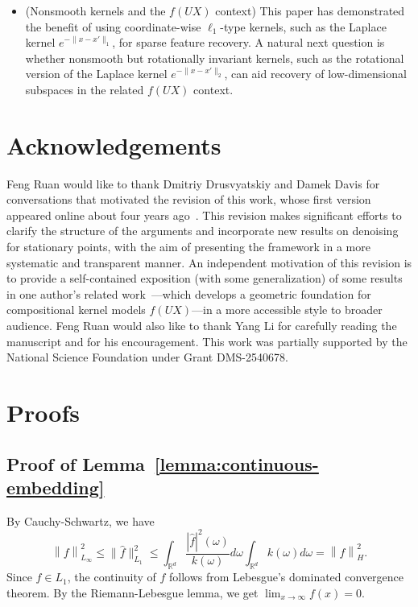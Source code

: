 \documentclass[sn-mathphys-num]{sn-jnl}%
\numberwithin{equation}{section}
\newcommand{\R}{\mathbb{R}}
\newcommand{\norm}[1]{\left\|{#1}\right\|} %
\theoremstyle{thmstyleone}%
\theoremstyle{thmstyletwo}%
\theoremstyle{thmstylethree}%
\begin{document}
\begin{itemize}
\vspace{.5em} 
\item (Nonsmooth kernels and the $f(UX)$ context) This paper has demonstrated the benefit of using coordinate-wise $\ell_1$-type kernels, such as the Laplace kernel $e^{-\|x-x'\|_1}$, for sparse feature recovery. A natural next question is whether nonsmooth but rotationally invariant kernels, such as the rotational version of the Laplace kernel $e^{-\|x-x'\|_2}$, can aid recovery of low-dimensional subspaces in the related $f(UX)$ context. 

\end{itemize}




\section{Acknowledgements} 
Feng Ruan would like to thank Dmitriy Drusvyatskiy and Damek Davis for conversations that motivated the revision of this work, whose first version appeared online about four years ago~\cite{RuanLiJo21}. This revision makes significant efforts to clarify the structure of the arguments and incorporate new results on denoising for stationary points, with the aim of presenting the framework in a more systematic and transparent manner. An independent motivation of this revision is to provide a self-contained exposition (with some generalization) of some results in one author’s related work~\cite{LiRu25, LiRub25}---which develops a geometric foundation for compositional kernel models $f(UX)$---in a more accessible style to broader audience. Feng Ruan would also like to thank Yang Li for carefully reading the manuscript and for his encouragement.  This work was partially supported by the National Science Foundation under Grant DMS-2540678.

\newpage


\newpage
\appendix

\section{Proofs} 
\subsection{Proof of Lemma~\ref{lemma:continuous-embedding}}
\label{sec:proof-lemma-continuous-embedding}
By Cauchy-Schwartz, we have 
\begin{equation*}
	\norm{f}_{L_\infty}^2 \le \|\hat{f}\|_{L_1}^2 \le 
		 \int_{\R^d} \frac{|\hat{f}|^2(\omega)}{k(\omega)} d\omega \int_{\R^d} k(\omega) d\omega = \norm{f}_H^2.
\end{equation*} 
Since $\hat{f} \in L_1$, the continuity of $f$ follows from Lebesgue's dominated convergence theorem. 
By the Riemann-Lebesgue lemma, we get $\lim_{x \to \infty} f(x) = 0$.
\end{document}
